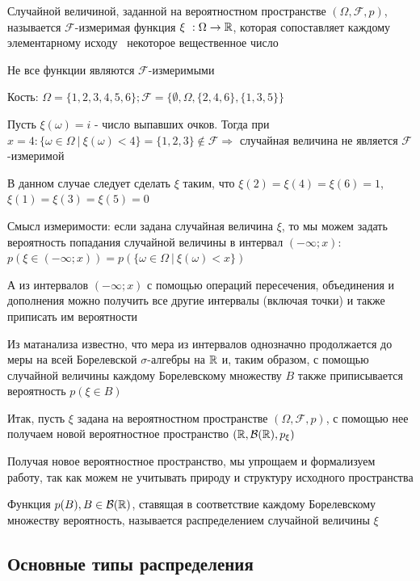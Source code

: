 \documentclass[12pt]{article}
\begin{document}
    \Def Случайной величиной, заданной на вероятностном пространстве $(\Omega, \mathcal{F}, p)$, называется
    $\mathcal{F}$-измеримая функция $\xi \ : \Omega \to \mathbb{R}$, которая сопоставляет каждому элементарному исходу \
    некоторое вещественное число

    \Nota Не все функции являются $\mathcal{F}$-измеримыми

    \Exs Кость: $\Omega = \{1, 2, 3, 4, 5, 6\}; \mathcal{F} = \{\emptyset, \Omega, \{2, 4, 6\}, \{1, 3, 5\}\}$

    Пусть $\xi(\omega) = i$ - число выпавших очков. Тогда при $x = 4: \{\omega \in \Omega \ | \ \xi (\omega) < 4\} = \{1, 2, 3\} \notin \mathcal{F} \Longrightarrow$ случайная величина не является $\mathcal{F}$-измеримой

    В данном случае следует сделать $\xi$ таким, что $\xi(2) = \xi(4) = \xi(6) = 1$, $\xi(1) = \xi(3) = \xi(5) = 0$

    \Nota Смысл измеримости: если задана случайная величина $\xi$, то мы можем задать вероятность попадания случайной
    величины в интервал $(-\infty; x)$: $p(\xi \in (-\infty; x)) = p(\{\omega \in \Omega \ | \ \xi(\omega) < x\})$

    А из интервалов $(-\infty; x)$ с помощью операций пересечения, объединения и дополнения можно получить все другие
    интервалы (включая точки) и также приписать им вероятности

    Из матанализа известно, что мера из интервалов однозначно продолжается до меры на всей Борелевской $\sigma$-алгебры на $\mathbb{R}$
    и, таким образом, с помощью случайной величины каждому Борелевскому множеству $B$ также приписывается вероятность $p(\xi \in B)$

    Итак, пусть $\xi$ задана на вероятностном пространстве $(\Omega, \mathcal{F}, p)$, с помощью нее получаем новой вероятностное
    пространство $(\mathbb{R}, \mathcal{B}(\mathbb{R}), p_\xi)$

    Получая новое вероятностное пространство, мы упрощаем и формализуем работу, так как можем не учитывать природу и структуру исходного пространства

    \Def Функция $p(B), B \in \mathcal{B}(\mathbb{R})$, ставящая в соответствие каждому Борелевскому множеству вероятность,
    называется распределением случайной величины $\xi$

    \subsection{Основные типы распределения}
\end{document}
